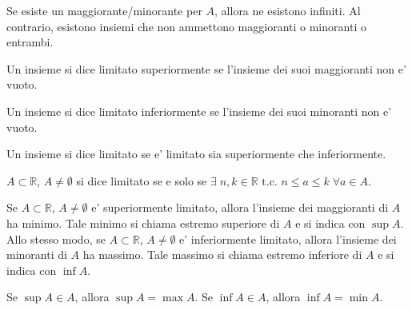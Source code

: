 \documentclass{report}
\newcommand{\RR}{\mathbb{R}}
\begin{document}
    \theoremstyle{remark}
    \begin{obs}
        Se esiste un maggiorante/minorante per $A$, allora ne esistono infiniti.
        Al contrario, esistono insiemi che non ammettono maggioranti o minoranti o entrambi.
    \end{obs}

    \theoremstyle{definition}
    \begin{defin}
        Un insieme si dice limitato superiormente se l'insieme dei suoi maggioranti
        non e' vuoto.
    \end{defin}
    
    \begin{defin}
        Un insieme si dice limitato inferiormente se l'insieme dei suoi minoranti
        non e' vuoto.
    \end{defin}

    \begin{defin}
        Un insieme si dice limitato se e' limitato sia superiormente che inferiormente.
    \end{defin}

    \theoremstyle{remark}
    \begin{obs}
        $A \subset \RR$, $A \neq \emptyset$ si dice limitato se e solo se 
        $\exists \;n, k \in \RR \text{ t.c. } n \leq a \leq k \;\forall a \in A$.
    \end{obs}

    \theoremstyle{plain}
    \begin{theorem}
        Se $A \subset \RR$, $A \neq \emptyset$ e' superiormente limitato, allora
        l'insieme dei maggioranti di $A$ ha minimo. Tale minimo si chiama estremo
        superiore di $A$ e si indica con $\sup{A}$. \newline
        Allo stesso modo, se $A \subset \RR$, $A \neq \emptyset$ e' inferiormente 
        limitato, allora 
        l'insieme dei minoranti di $A$ ha massimo. Tale massimo si chiama estremo
        inferiore di $A$ e si indica con $\inf{A}$.
    \end{theorem}  

    \theoremstyle{remark}
    \begin{obs}
        Se $\sup{A} \in A$, allora $\sup{A} = \max{A}$. \newline
        Se $\inf{A} \in A$, allora $\inf{A} = \min{A}$. 
    \end{obs}
\end{document}
